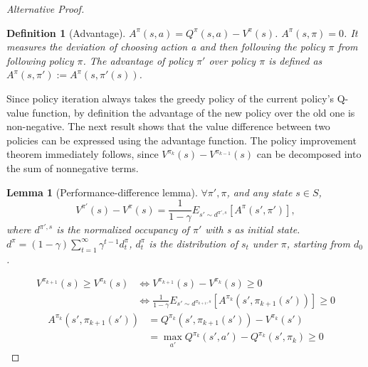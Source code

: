 \documentclass{report}
\newtheorem{definition}{Definition}[theorem]
\newtheorem{lemma}[theorem]{Lemma}
\begin{document}
\begin{proof}[Alternative Proof]
    \begin{definition}[Advantage]
    $A^{\pi}(s,a)=Q^{\pi}(s,a)-V^{\pi}(s)$. $A^{\pi}(s,\pi)=0$. It measures the deviation of choosing action a and then following the policy $\pi$ from following policy $\pi$. The advantage of policy $\pi'$ over policy $\pi$ is defined as $A^{\pi}(s,\pi'):=A^{\pi}(s,\pi'(s))$.
    \end{definition}
    Since policy iteration always takes the greedy policy of the current policy’s Q-value function, by definition the advantage of the new policy over the old one is non-negative. The next result shows that the value difference between two policies can be expressed using the advantage function. The policy improvement theorem immediately follows, since $V^{\pi_k}(s)-V^{\pi_{k-1}}(s)$ can be decomposed into the sum of nonnegative terms.
    \begin{lemma}[Performance-difference lemma\cite{Kakade2002ApproximatelyLearning}]
        $\forall \pi',\pi$, and any state $s\in S$, \[
            V^{\pi'}(s)-V^{\pi}(s)=\frac{1}{1-\gamma}E_{s'\sim d^{\pi',s}}[A^{\pi}(s',\pi')],
        \] 
        where $d^{\pi',s}$ is the normalized occupancy of $\pi'$ with s as initial state.\\
        $d^{\pi}=(1-\gamma)\sum_{t=1}^{\infty}\gamma^{t-1}d^{\pi}_t$, $d^{\pi}_t$ is the distribution of $s_t$ under $\pi$, starting from $d_0$.
    \end{lemma}
    \begin{equation*}
    \begin{split}
                V^{\pi_{k+1}}(s) \geq V^{\pi_{k}}(s) &\Leftrightarrow  V^{\pi_{k+1}}(s) - V^{\pi_{k}}(s) \geq 0 \\
                & \Leftrightarrow \frac{1}{1-\gamma}E_{s' \sim d^{\pi_{k+1},s}}[A^{\pi_k}(s',\pi_{k+1}(s'))] \geq 0
    \end{split}
    \end{equation*}
    \begin{equation*}
        \begin{split}
            A^{\pi_k}(s',\pi_{k+1}(s')) &= Q^{\pi_k}(s',\pi_{k+1}(s'))-V^{\pi_k}(s') \\
            & = \max_{a'}Q^{\pi_k}(s',a')-Q^{\pi_k}(s',\pi_k) \geq 0
        \end{split}
    \end{equation*}

\end{proof}
\end{document}
